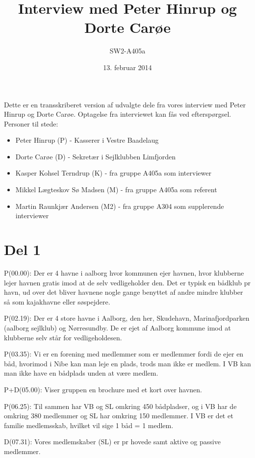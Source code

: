 \documentclass{article}
\begin{document}
\title{Interview med Peter Hinrup og Dorte Carøe}
\author{SW2-A405a}
\date{13. februar 2014}
\maketitle
Dette er en transskriberet version af udvalgte dele fra vores interview med Peter Hinrup og Dorte Carøe. Optagelse fra interviewet kan fås ved efterspørgsel. Personer til stede:

\begin{itemize}
    \item Peter Hinrup (P) - Kasserer i Vestre Baadelaug
    \item Dorte Carøe (D) - Sekretær i Sejlklubben Limfjorden
    \item Kasper Kohsel Terndrup (K) - fra gruppe A405a som interviewer
    \item Mikkel Lægteskov Sø Madsen (M) - fra gruppe A405a som referent
    \item Martin Raunkjær Andersen (M2) - fra gruppe A304 som supplerende interviewer
\end{itemize}

\section{Del 1}
P(00.00): Der er 4 havne i aalborg hvor kommunen ejer havnen, hvor klubberne lejer havnen gratis imod at de selv vedligeholder den. Det er typisk en bådklub pr havn, ud over det bliver havnene nogle gange benyttet af andre mindre klubber så som kajakhavne eller søspejdere.

P(02.19): Der er 4 store havne i Aalborg, den her, Skudehavn, Marinafjordparken (aalborg sejlklub) og Nørresundby. De er ejet af Aalborg kommune imod at klubberne selv står for vedligeholdesen.

P(03.35): Vi er en forening med medlemmer som er medlemmer fordi de ejer en båd, hvorimod i Nibe kan man leje en plads, trods man ikke er medlem. I VB kan man ikke have en bådplads unden at være medlem.

P+D(05.00): Viser gruppen en brochure med et kort over havnen.

P(06.25): Til sammen har VB og SL omkring 450 bådpladser, og i VB har de omkring 380 medlemmer og SL har omkring 150 medlemmer. I VB er det et familie medlemsskab, hvilket vil sige 1 båd = 1 medlem. 

D(07.31): Vores medlemskaber (SL)    er pr hovede samt aktive og passive medlemmer.
\end{document}
